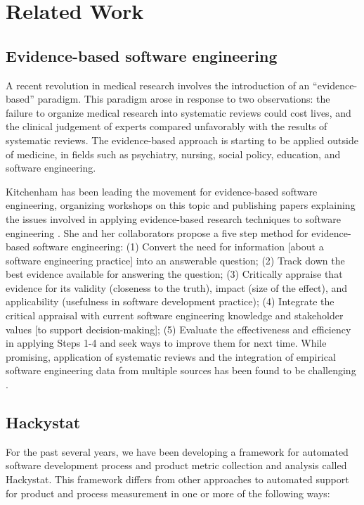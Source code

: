 \section{Related Work}

\subsection{Evidence-based software engineering}

A recent revolution in medical research involves the introduction of an
``evidence-based'' paradigm.  This paradigm arose in response to two
observations: the failure to organize medical research into systematic
reviews could cost lives, and the clinical judgement of experts compared
unfavorably with the results of systematic reviews.   The evidence-based 
approach is starting to be applied outside of medicine, in fields such as
psychiatry, nursing, social policy, education, and software engineering. 

Kitchenham has been leading the movement for evidence-based software
engineering, organizing workshops on this topic and publishing papers
explaining the issues involved in applying evidence-based research
techniques to software engineering \cite{Kitchenham04,Kitchenham04a}.  She
and her collaborators propose a five step method for evidence-based
software engineering: (1) Convert the need for information [about a
software engineering practice] into an answerable question; (2) Track down
the best evidence available for answering the question; (3) Critically
appraise that evidence for its validity (closeness to the truth), impact
(size of the effect), and applicability (usefulness in software development
practice); (4) Integrate the critical appraisal with current software
engineering knowledge and stakeholder values [to support decision-making];
(5) Evaluate the effectiveness and efficiency in applying Steps 1-4 and
seek ways to improve them for next time.  While promising, application of 
systematic reviews and the integration of empirical software engineering data
from multiple sources has been found to be challenging \cite{Jedlitschka04}.

\subsection{Hackystat}

For the past several years, we have been developing a framework for
automated software development process and product metric collection
and analysis called Hackystat.  This framework differs from other
approaches to automated support for product and process measurement in
one or more of the following ways:

